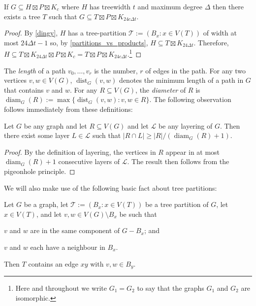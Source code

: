 \documentclass{patmorin}
\newcommand{\defin}[1]{\emph{\color{brightmaroon}#1}}
\DeclareMathOperator{\dist}{dist}
\DeclareMathOperator{\diam}{diam}
\begin{document}
\begin{cor}
  If $G\subseteq H\boxtimes P\boxtimes K_c$ where $H$ has treewidth $t$ and maximum degree $\Delta$ then there exists a tree $T$ such that $G\subseteq T\boxtimes P\boxtimes K_{24c\Delta t}$. 
\end{cor}

\begin{proof}
  By \cref{dingy}, $H$ has a tree-partition $\mathcal{T}:=(B_x:x\in V(T))$ of width at most $24\Delta t-1$ so, by \cref{partitions_vs_products}, $H \subseteq T\boxtimes K_{24\Delta t}$.  Therefore, $H\subseteq T\boxtimes K_{24\Delta t}\boxtimes P\boxtimes K_c = T\boxtimes P\boxtimes K_{24c\Delta t}$.\footnote{Here and throughout we write $G_1=G_2$ to say that the graphs $G_1$ and $G_2$ are isomorphic.}
\end{proof}


The \defin{length} of a path $v_0,\ldots,v_r$ is the number, $r$ of edges in the path. For any two vertices $v,w\in V(G)$, $\dist_G(v,w)$ denotes the minimum length of a path in $G$ that contains $v$ and $w$. For any $R\subseteq V(G)$, the \defin{diameter} of $R$ is $\diam_G(R):=\max\{\dist_G(v,w):v,w\in R\}$.  The following observation follows immediately from these definitions:

\begin{obs}\label{diameter_spread}
  Let $G$ be any graph and let $R\subseteq V(G)$ and let $\mathcal{L}$ be any layering of $G$.  Then there exist some layer $L\in\mathcal{L}$ such that $|R\cap L|\ge |R|/(\diam_G(R)+1)$.
\end{obs}

\begin{proof}
  By the definition of layering, the vertices in $R$ appear in at most $\diam_G(R)+1$ consecutive layers of $\mathcal{L}$. The result then follows from the pigeonhole principle.
\end{proof}


We will also make use of the following basic fact about tree partitions:

\begin{obs}\label{tree_thingy}
  Let $G$ be a graph, let $\mathcal{T}:=(B_x:x\in V(T))$ be a tree partition of $G$, let $x\in V(T)$, and let $v,w\in V(G)\setminus B_x$ be such that
  \begin{inparaenum}[(a)] 
    \item $v$ and $w$ are in the same component of $G-B_x$; and 
    \item $v$ and $w$ each have a neighbour in $B_x$.
  \end{inparaenum}
  Then $T$ contains an edge $xy$ with $v,w\in B_y$.
\end{obs}
\end{document}

